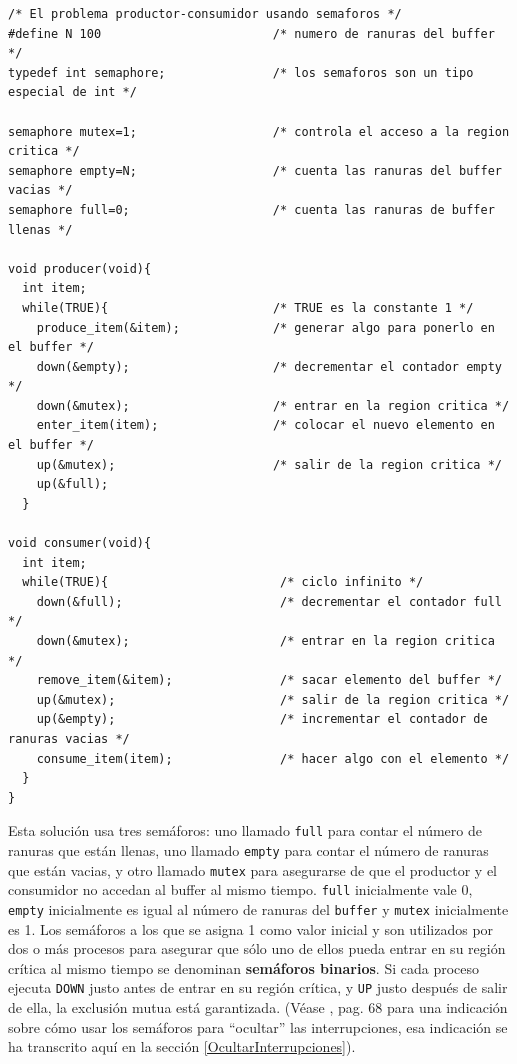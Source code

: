 \documentclass{article}
\begin{document}
\begin{verbatim}
/* El problema productor-consumidor usando semaforos */
#define N 100                        /* numero de ranuras del buffer */
typedef int semaphore;               /* los semaforos son un tipo especial de int */

semaphore mutex=1;                   /* controla el acceso a la region critica */
semaphore empty=N;                   /* cuenta las ranuras del buffer vacias */
semaphore full=0;                    /* cuenta las ranuras de buffer llenas */

void producer(void){
  int item;
  while(TRUE){                       /* TRUE es la constante 1 */
    produce_item(&item);             /* generar algo para ponerlo en el buffer */
    down(&empty);                    /* decrementar el contador empty */
    down(&mutex);                    /* entrar en la region critica */
    enter_item(item);                /* colocar el nuevo elemento en el buffer */
    up(&mutex);                      /* salir de la region critica */
    up(&full);
  }

void consumer(void){
  int item;
  while(TRUE){                        /* ciclo infinito */
    down(&full);                      /* decrementar el contador full */
    down(&mutex);                     /* entrar en la region critica */
    remove_item(&item);               /* sacar elemento del buffer */
    up(&mutex);                       /* salir de la region critica */
    up(&empty);                       /* incrementar el contador de ranuras vacias */
    consume_item(item);               /* hacer algo con el elemento */
  }
}
\end{verbatim}
Esta soluci\'on usa tres sem\'aforos: uno llamado {\tt full} para contar el n\'umero 
de ranuras que est\'an llenas, uno llamado {\tt empty} para contar el n\'umero de ranuras 
que est\'an vacias, y otro llamado {\tt mutex} para asegurarse de que el productor y el 
consumidor no accedan al buffer al mismo tiempo. {\tt full} inicialmente vale 0, 
{\tt empty} inicialmente es igual al n\'umero de ranuras del {\tt buffer} y {\tt mutex} 
inicialmente es 1. Los sem\'aforos a los que se asigna 1 como valor inicial y son 
utilizados por dos o m\'as procesos para asegurar que s\'olo uno de ellos pueda entrar 
en su regi\'on cr\'itica al mismo tiempo se denominan {\bf sem\'aforos binarios}. Si 
cada proceso ejecuta {\tt DOWN} justo antes de entrar en su regi\'on cr\'itica, y {\tt UP} 
justo despu\'es de salir de ella, la exclusi\'on mutua est\'a garantizada. (V\'ease 
\cite{Tanenbaum}, pag. 68 para una indicaci\'on sobre c\'omo usar los sem\'aforos 
para ``ocultar'' las interrupciones, esa indicaci\'on se ha transcrito aqu\'i en la 
secci\'on \ref{OcultarInterrupciones}). 
\end{document}
